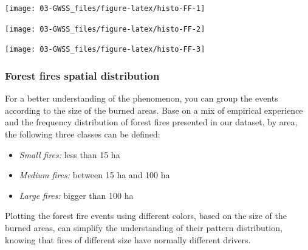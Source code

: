 \documentclass[
]{article}
\newenvironment{Shaded}{\begin{snugshade}}{\end{snugshade}}
\newcommand{\CommentTok}[1]{\textcolor[rgb]{0.56,0.35,0.01}{\textit{#1}}}
\newcommand{\FunctionTok}[1]{\textcolor[rgb]{0.13,0.29,0.53}{\textbf{#1}}}
\newcommand{\NormalTok}[1]{#1}
\newcommand{\SpecialCharTok}[1]{\textcolor[rgb]{0.81,0.36,0.00}{\textbf{#1}}}
\providecommand{\tightlist}{%
  \setlength{\itemsep}{0pt}\setlength{\parskip}{0pt}}
\begin{document}
\begin{center}\texttt{[image: 03-GWSS\_files/figure-latex/histo-FF-1]} \end{center}

\begin{Shaded}
\end{Shaded}

\begin{center}\texttt{[image: 03-GWSS\_files/figure-latex/histo-FF-2]} \end{center}

\begin{Shaded}
\end{Shaded}

\begin{center}\texttt{[image: 03-GWSS\_files/figure-latex/histo-FF-3]} \end{center}

\subsubsection{Forest fires spatial distribution}\label{forest-fires-spatial-distribution}

For a better understanding of the phenomenon, you can group the events according to the size of the burned areas. Base on a mix of empirical experience and the frequency distribution of forest fires presented in our dataset, by area, the following three classes can be defined:

\begin{itemize}
\tightlist
\item
  \emph{Small fires:} less than 15 ha
\item
  \emph{Medium fires:} between 15 ha and 100 ha
\item
  \emph{Large fires:} bigger than 100 ha
\end{itemize}

Plotting the forest fire events using different colors, based on the size of the burned areas, can simplify the understanding of their pattern distribution, knowing that fires of different size have normally different drivers.
\end{document}
